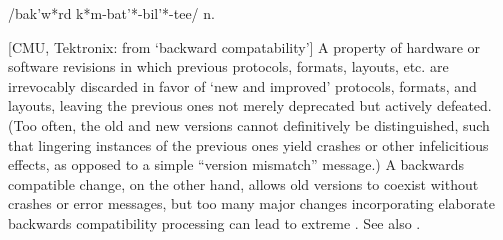  /bak'w*rd k*m-bat'*-bil'*-tee/ n.

[CMU, Tektronix: from `backward compatability'] A property of hardware or
software revisions in which previous protocols, formats, layouts, etc. are
irrevocably discarded in favor of `new and improved' protocols, formats, and
layouts, leaving the previous ones not merely deprecated but actively defeated.
(Too often, the old and new versions cannot definitively be distinguished, such
that lingering instances of the previous ones yield crashes or other
infelicitious effects, as opposed to a simple ``version mismatch'' message.) A
backwards compatible change, on the other hand, allows old versions to coexist
without crashes or error messages, but too many major changes incorporating
elaborate backwards compatibility processing can lead to extreme
. See also .

